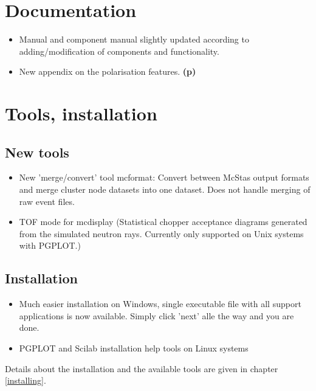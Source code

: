 \section{Documentation}
\label{s:new-features:documentation}
\begin{itemize}
\item Manual and component manual slightly updated according to
  adding/modification of components and functionality.
\item New appendix on the polarisation features. {\bf(p)}
\end{itemize}

\section{Tools, installation}
\label{s:new-features:tools}
\subsection{New tools}
\begin{itemize}
\item New 'merge/convert' tool mcformat: Convert between McStas output formats and merge cluster
    node datasets into one dataset. Does not handle merging of raw event files.
\item TOF mode for mcdisplay (Statistical chopper acceptance diagrams generated from the simulated
    neutron rays. Currently only supported on Unix systems with PGPLOT.)
\end{itemize}
\subsection{Installation}
\begin{itemize}
\item Much easier installation on Windows, single executable file with all support applications
    is now available. Simply click 'next' alle the way and you are done.
\item PGPLOT and Scilab installation help tools on Linux systems
\end{itemize}
Details about the installation and the available tools are given in chapter \ref{installing}.

